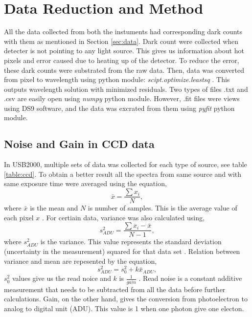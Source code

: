 \documentclass[a4paper,12pt]{article}
\begin{document}
\section{Data Reduction and Method}
\label{sec:reduction}
All the data collected from both the instuments had corresponding dark counts with them as mentioned in Section \ref{sec:data}. Dark count were collected when detecter is not pointing to any light source. This gives us information about hot pixels and error caused due to heating up of the detector. To reduce the error, these dark counts were substrated from the raw data. Then, data was converted from pixel to wavelength using python module: \textit{scipt.optimize.leastsq} \cite{scipy}. This outputs wavelength solution with minimized residuals. Two types of files .txt and .csv are easily open using \textit{numpy} python module. However, .fit files were views using DS9 software, and the data was excrated from them using \textit{pyfit} python module. 

\subsection{Noise and Gain in CCD data} 
\label{sec:noise_ccd}
In USB2000, multiple sets of data was collected for each type of source, see table \ref{table:ccd}. To obtain a better result all the spectra from same source and with same exposure time were averaged using the equation,  
\begin{equation}
\label{eq:mean}
\bar{x} = \frac{\sum x_i}{N},
\end{equation}
where $\bar{x}$ is the mean and $N$ is number of samples. This is the average value of each pixel $x$ \cite{error}. For certiain data, variance was also calculated using, 
\begin{equation}
\label{eq:variance}
s^2_{ADU} = \frac{\sum x_i - \bar{x}}{N-1},
\end{equation}
where $s^2_{ADU}$ is the variance. This value represents the standard deviation (uncertainty in the measurement) squared for that data set \cite{error}. Relation between variance and mean are repesented by the equation, 
\begin{equation}
\label{eq:gain}
s^2_{ADU} = s^2_0 + k\bar{x}_{ADU},
\end{equation}
$s^2_0$ values give us the read noice and $k$ is $\frac{1}{gain}$ \cite{instructions}. Read noise is a constant additive measurement that needs to be subtracted from all the data before further calculations. Gain, on the other hand, gives the conversion from photoelectron to analog to digital unit (ADU). This value is 1 when one photon give one electon. 
\end{document}
